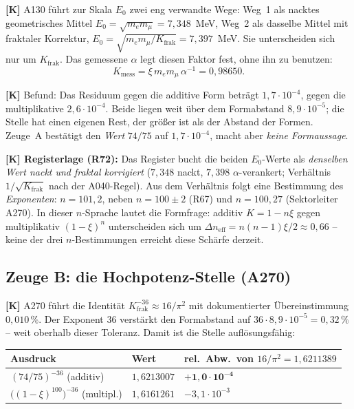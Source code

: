 \textbf{[K]} A130 führt zur Skala $E_0$ zwei eng verwandte Wege: Weg~1 als
nacktes geometrisches Mittel $E_0 = \sqrt{m_e m_\mu} = 7{,}348$~MeV, Weg~2
als dasselbe Mittel mit fraktaler Korrektur,
$E_0 = \sqrt{m_e m_\mu/K_\text{frak}} = 7{,}397$~MeV. Sie unterscheiden sich
nur um $K_\text{frak}$. Das gemessene $\alpha$ legt diesen Faktor fest,
ohne ihn zu benutzen:
\[
  K_\text{mess} = \xi\,m_e m_\mu\,\alpha^{-1} = 0{,}98650 .
\]

\textbf{[K]} Befund: Das Residuum gegen die additive Form beträgt
$1{,}7\cdot10^{-4}$, gegen die multiplikative $2{,}6\cdot10^{-4}$. Beide
liegen weit über dem Formabstand $8{,}9\cdot10^{-5}$; die Stelle hat einen
eigenen Rest, der größer ist als der Abstand der Formen. Zeuge~A bestätigt
den \emph{Wert} $74/75$ auf $1{,}7\cdot10^{-4}$, macht aber \emph{keine
Formaussage}.

\textbf{[K] Registerlage (R72):} Das
Register bucht die beiden $E_0$-Werte als \emph{denselben Wert nackt und
fraktal korrigiert} ($7{,}348$ nackt, $7{,}398$ $\alpha$-verankert;
Verhältnis $1/\sqrt{K_\text{frak}}$ nach der A040-Regel). Aus dem
Verhältnis folgt eine Bestimmung des \emph{Exponenten}:
$n = 101{,}2$, neben $n = 100\pm2$ (R67) und $n = 100{,}27$
(Sektorleiter A270). In dieser $n$-Sprache lautet die Formfrage: additiv
$K = 1-n\xi$ gegen multiplikativ $(1-\xi)^{n}$ unterscheiden sich um
$\Delta n_\text{eff} = n(n-1)\xi/2 \approx 0{,}66$ -- keine der drei
$n$-Bestimmungen erreicht diese Schärfe derzeit.

\subsection{Zeuge B: die Hochpotenz-Stelle (A270)}

\textbf{[K]} A270 f\"uhrt die Identit\"at
$K_\text{frak}^{-36} \approx 16/\pi^2$ mit dokumentierter
\"Ubereinstimmung $0{,}010\,\%$. Der Exponent $36$ verst\"arkt den
Formabstand auf $36\cdot8{,}9\cdot10^{-5} = 0{,}32\,\%$ -- weit oberhalb
dieser Toleranz. Damit ist die Stelle aufl\"osungsf\"ahig:

\begin{center}
\begin{tabular}{lll}
\toprule
Ausdruck & Wert & rel.\ Abw.\ von $16/\pi^2 = 1{,}6211389$ \\
\midrule
$(74/75)^{-36}$ (additiv) & $1{,}6213007$ & $\mathbf{+1{,}0\cdot10^{-4}}$ \\
$\bigl((1-\xi)^{100}\bigr)^{-36}$ (multipl.) & $1{,}6161261$ & $-3{,}1\cdot10^{-3}$ \\
\bottomrule
\end{tabular}
\end{center}

